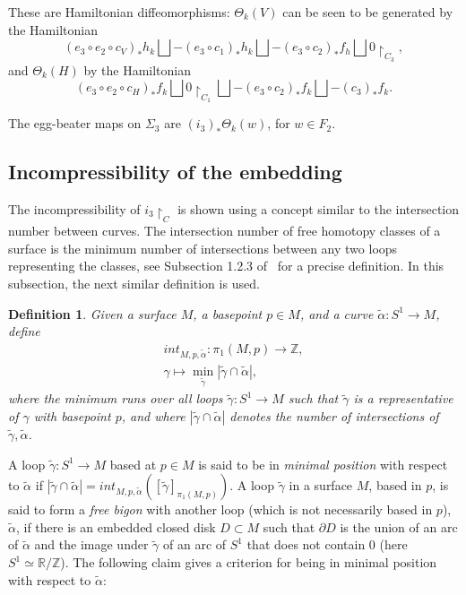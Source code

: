 \documentclass[11pt]{article}
\newenvironment{myequation}
    {
        \begin{equation*}
        \begin{gathered}
    }
    { 
        \end{gathered} 
        \end{equation*}
    }
\newtheorem{definition}[theorem]{Definition}
\newcommand{\R}{\mathbb{R}}
\newcommand{\Z}{\mathbb{Z}}
\begin{document}
        These are Hamiltonian diffeomorphisms: $\Theta_k(V)$ can be seen to be generated by the Hamiltonian
        \[
            (e_3 \circ e_2 \circ c_V)_* h_k \bigsqcup -(e_3 \circ c_1)_* h_k \bigsqcup -(e_3 \circ c_2)_* f_h \bigsqcup 0 \restriction_{C_3} ,
        \]
        and $\Theta_k(H)$ by the Hamiltonian
        \[
            (e_3 \circ e_2 \circ c_H)_* f_k \bigsqcup 0 \restriction_{C_1} \bigsqcup -(e_3 \circ c_2)_* f_k \bigsqcup -(c_3)_* f_k .
        \]
        
        The egg-beater maps on $\Sigma_3$ are $(i_3)_* \Theta_k(w)$, for $w \in F_2$.
    
    \subsection{Incompressibility of the embedding}
        The incompressibility of $i_3 \restriction_C$ is shown using a concept similar to the  intersection number between curves. The intersection number of free homotopy classes of a surface is the minimum number of intersections between any two loops representing the classes, see Subsection 1.2.3 of~\cite{FM} for a precise definition. In this subsection, the next similar definition is used.

        \begin{definition}
            Given a surface $M$, a basepoint $p \in M$, and a curve $\tilde{\alpha}: S^1 \to M$, define
            \begin{myequation}
                int_{M,p,\tilde{\alpha}}: \pi_1(M,p) \to \Z ,\\
                \gamma \mapsto \min_{\tilde{\gamma}} |\tilde{\gamma} \cap \tilde{\alpha}| ,
            \end{myequation}
            where the minimum runs over all loops $\tilde{\gamma}: S^1 \to M$ such that $\tilde{\gamma}$ is a representative of $\gamma$ with basepoint $p$, and where $|\tilde{\gamma} \cap \tilde{\alpha}|$ denotes the number of intersections of $\tilde{\gamma},\tilde{\alpha}$.
        \end{definition}    
        A loop $\tilde{\gamma}: S^1 \to M$ based at $p \in M$ is said to be in \textit{minimal position} with respect to $\tilde{\alpha}$ if $|\tilde{\gamma} \cap \tilde{\alpha}| = int_{M,p,\tilde{\alpha}}([\tilde{\gamma}]_{\pi_1(M,p)})$. A loop $\tilde{\gamma}$ in a surface $M$, based in $p$, is said to form a \textit{free bigon} with another loop (which is not necessarily based in $p$), $\tilde{\alpha}$, if there is an embedded closed disk $D \subset M$ such that $\partial D$ is the union of an arc of $\tilde{\alpha}$ and the image under $\tilde{\gamma}$ of an arc of $S^1$ that does not contain 0 (here $S^1 \simeq \R / \Z$). The following claim gives a criterion for being in minimal position with respect to $\tilde{\alpha}$:
        
\end{document}
